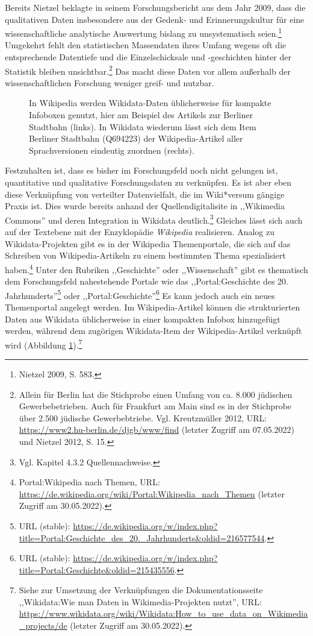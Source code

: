 Bereits Nietzel beklagte in seinem Forschungsbericht aus dem Jahr 2009, dass die qualitativen Daten insbesondere aus der Gedenk- und Erinnerungskultur für eine wissenschaftliche analytische Auswertung bislang zu unsystematisch seien.\footnote{Nietzel 2009, S. 583.} Umgekehrt fehlt den statistischen Massendaten ihres Umfang wegens oft die entsprechende Datentiefe und die Einzelschicksale und -geschichten hinter der Statistik bleiben unsichtbar.\footnote{Allein für Berlin hat die Stichprobe einen Umfang von ca. 8.000 jüdischen Gewerbebetrieben. Auch für Frankfurt am Main sind es in der Stichprobe über 2.500 jüdische Gewerbebtriebe. Vgl. Kreutzmüller 2012, URL: \url{https://www2.hu-berlin.de/djgb/www/find} (letzter Zugriff am 07.05.2022) und Nietzel 2012, S. 15.} Das macht diese Daten vor allem außerhalb der wissenschaftlichen Forschung weniger greif- und nutzbar. 

\begin{figure}[h]
    \centering
    \caption{In Wikipedia werden Wikidata-Daten üblicherweise für kompakte Infoboxen genutzt, hier am Beispiel des Artikels zur Berliner Stadtbahn (links). In Wikidata wiederum lässt sich dem Item Berliner Stadtbahn (Q694223) der Wikipedia-Artikel aller Sprachversionen eindeutig zuordnen (rechts).}
    \label{fig:wikidatawikipedia}
\end{figure}

Festzuhalten ist, dass es bisher im Forschungsfeld noch nicht gelungen ist, quantitative und qualitative Forschungsdaten zu verknüpfen. Es ist aber eben diese Verknüpfung von verteilter Datenvielfalt, die im Wiki*versum gängige Praxis ist. Dies wurde bereits anhand der Quellendigitalisite in ,,Wikimedia Commons'' und deren Integration in Wikidata deutlich.\footnote{Vgl. Kapitel 4.3.2 Quellennachweise.} Gleiches lässt sich auch auf der Textebene mit der Enzyklopädie \textit{Wikipedia} realisieren. Analog zu Wikidata-Projekten gibt es in der Wikipedia Themenportale, die sich auf das Schreiben von Wikipedia-Artikeln zu einem bestimmten Thema spezialisiert haben.\footnote{Portal:Wikipedia nach Themen, URL: \url{https://de.wikipedia.org/wiki/Portal:Wikipedia_nach_Themen} (letzter Zugriff am 30.05.2022).} Unter den Rubriken ,,Geschichte'' oder ,,Wissenschaft'' gibt es thematisch dem Forschungsfeld nahestehende Portale wie das ,,Portal:Geschichte des 20. Jahrhunderts''\footnote{URL (stable): \url{https://de.wikipedia.org/w/index.php?title=Portal:Geschichte\_des\_20.\_Jahrhunderts\&oldid=216577544}.} oder ,,Portal:Geschichte''\footnote{URL (stable): \url{https://de.wikipedia.org/w/index.php?title=Portal:Geschichte\&oldid=215435556}.} Es kann jedoch auch ein neues Themenportal angelegt werden. Im Wikipedia-Artikel können die strukturierten Daten aus Wikidata üblicherweise in einer kompakten Infobox hinzugefügt werden, während dem zugörigen Wikidata-Item der Wikipedia-Artikel verknüpft wird (Abbildung \ref{fig:wikidatawikipedia}).\footnote{Siehe zur Umsetzung der Verknüpfungen die Dokumentationsseite ,,Wikidata:Wie man Daten in Wikimedia-Projekten nutzt'', URL: \url{https://www.wikidata.org/wiki/Wikidata:How_to_use_data_on_Wikimedia_projects/de} (letzter Zugriff am 30.05.2022).}

